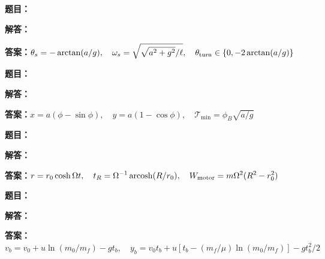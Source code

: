 \documentclass[lang=cn,color=blue,11pt]{elegantbook}
\begin{document}
\noindent\textbf{题目：}
\par\noindent\textbf{解答：}
\par\noindent\textbf{答案：}\(\displaystyle \theta_s=-\arctan(a/g),\quad\omega_s=\sqrt{\sqrt{a^2+g^2}/\ell},\quad\theta_{\rm turn}\in\{0,-2\arctan(a/g)\}\)\par
\par\smallskip\noindent\hrulefill\par\medskip
{}\par
\noindent\textbf{题目：}
\par\noindent\textbf{解答：}
\par\noindent\textbf{答案：}\(\displaystyle x=a(\phi-\sin\phi),\quad y=a(1-\cos\phi),\quad \mathcal T_{\min}=\phi_B\sqrt{a/g}\)\par
\par\smallskip\noindent\hrulefill\par\medskip
{}\par
\noindent\textbf{题目：}
\par\noindent\textbf{解答：}
\par\noindent\textbf{答案：}\(\displaystyle r=r_0\cosh\Omega t,\quad t_R=\Omega^{-1}\operatorname{arcosh}(R/r_0),\quad W_{\rm motor}=m\Omega^2(R^2-r_0^2)\)\par
\par\smallskip\noindent\hrulefill\par\medskip
{}\par
\noindent\textbf{题目：}
\par\noindent\textbf{解答：}
\par\noindent\textbf{答案：}\(\displaystyle v_b=v_0+u\ln(m_0/m_f)-gt_b,\quad y_b=v_0t_b+u[t_b-(m_f/\mu)\ln(m_0/m_f)]-gt_b^2/2\)\par
\par\smallskip\noindent\hrulefill\par\medskip
{}\par
\end{document}
